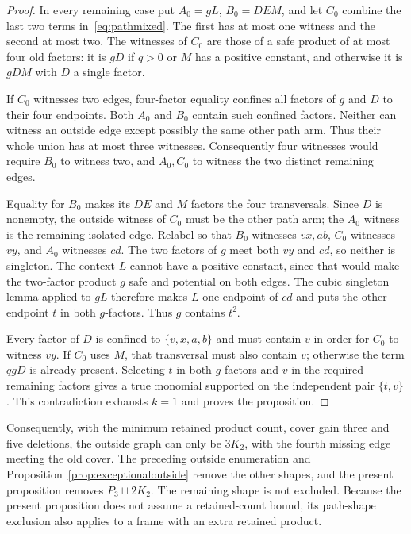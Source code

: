 \documentclass[11pt]{article}
\theoremstyle{definition}
\theoremstyle{remark}
\begin{document}
\begin{proof}
In every remaining case put $A_0=gL$, $B_0=DEM$, and let $C_0$ combine the last two terms in~\eqref{eq:pathmixed}. The first has at most one witness and the second at most two. The witnesses of $C_0$ are those of a safe product of at most four old factors: it is $gD$ if $q>0$ or $M$ has a positive constant, and otherwise it is $gDM$ with $D$ a single factor.

If $C_0$ witnesses two edges, four-factor equality confines all factors of $g$ and $D$ to their four endpoints. Both $A_0$ and $B_0$ contain such confined factors. Neither can witness an outside edge except possibly the same other path arm. Thus their whole union has at most three witnesses. Consequently four witnesses would require $B_0$ to witness two, and $A_0,C_0$ to witness the two distinct remaining edges.

Equality for $B_0$ makes its $DE$ and $M$ factors the four transversals. Since $D$ is nonempty, the outside witness of $C_0$ must be the other path arm; the $A_0$ witness is the remaining isolated edge. Relabel so that $B_0$ witnesses $vx,ab$, $C_0$ witnesses $vy$, and $A_0$ witnesses $cd$. The two factors of $g$ meet both $vy$ and $cd$, so neither is singleton. The context $L$ cannot have a positive constant, since that would make the two-factor product $g$ safe and potential on both edges. The cubic singleton lemma applied to $gL$ therefore makes $L$ one endpoint of $cd$ and puts the other endpoint $t$ in both $g$-factors. Thus $g$ contains $t^2$.

Every factor of $D$ is confined to $\{v,x,a,b\}$ and must contain $v$ in order for $C_0$ to witness $vy$. If $C_0$ uses $M$, that transversal must also contain $v$; otherwise the term $qgD$ is already present. Selecting $t$ in both $g$-factors and $v$ in the required remaining factors gives a true monomial supported on the independent pair $\{t,v\}$. This contradiction exhausts $k=1$ and proves the proposition.
\end{proof}

Consequently, with the minimum retained product count, cover gain three and five deletions, the outside graph can only be $3K_2$, with the fourth missing edge meeting the old cover. The preceding outside enumeration and Proposition~\ref{prop:exceptionaloutside} remove the other shapes, and the present proposition removes $P_3\sqcup2K_2$. The remaining shape is not excluded. Because the present proposition does not assume a retained-count bound, its path-shape exclusion also applies to a frame with an extra retained product.
\end{document}
